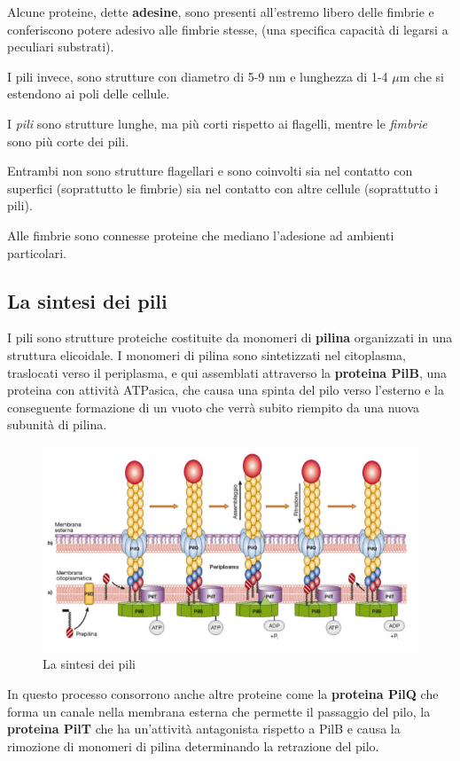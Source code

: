 \documentclass[11pt]{book}
\begin{document}
Alcune proteine, dette \textbf{adesine}, sono presenti all'estremo libero delle fimbrie e conferiscono potere adesivo alle fimbrie stesse, (una specifica capacità di legarsi a peculiari substrati).

I pili invece, sono strutture con diametro di 5-9 nm e lunghezza di 1-4 $\mu$m che si estendono ai poli delle cellule.

I \emph{pili} sono strutture lunghe, ma più corti rispetto ai flagelli, mentre le \emph{fimbrie} sono più corte dei pili.

Entrambi non sono strutture flagellari e sono coinvolti sia nel contatto con superfici (soprattutto le fimbrie) sia nel contatto con altre cellule (soprattutto i pili).

\vspace{1em}
Alle fimbrie sono connesse proteine che mediano l'adesione ad ambienti particolari.


\subsection{La sintesi dei pili}
I pili sono strutture proteiche costituite da monomeri di \textbf{pilina} organizzati in una struttura elicoidale. I monomeri di pilina sono sintetizzati nel citoplasma, traslocati verso il periplasma, e qui assemblati attraverso la \textbf{proteina PilB}, una proteina con attività ATPasica, che causa una spinta del pilo verso l’esterno e la conseguente formazione di un vuoto che verrà subito riempito da una nuova subunità di pilina.

\begin{figure}[htp]
\centering
\includegraphics[scale=0.4]{img/Sintesi pili.png}
\caption{La sintesi dei pili}
\label{}
\end{figure}

In questo processo consorrono anche altre proteine come la \textbf{proteina PilQ} che forma un canale nella membrana esterna che permette il passaggio del pilo, la \textbf{proteina PilT} che ha un'attività antagonista rispetto a PilB e causa la rimozione di monomeri di pilina determinando la retrazione del pilo.
\end{document}
